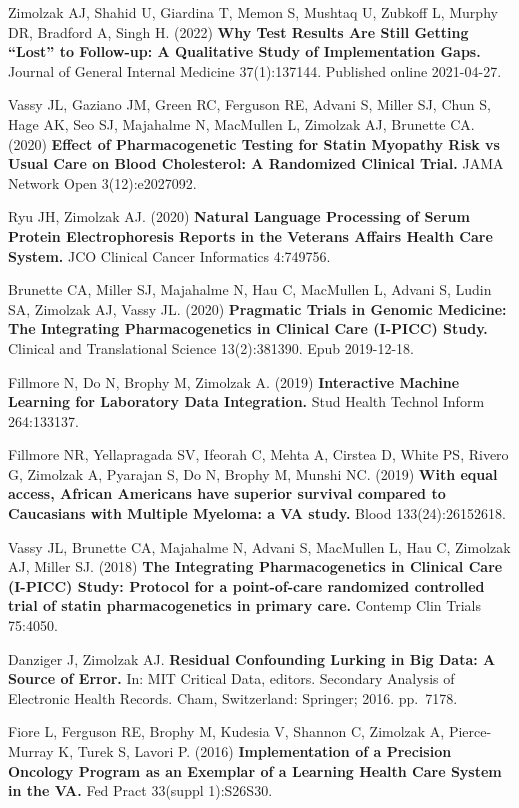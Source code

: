 \documentclass[10pt]{article}
\begin{document}
Zimolzak AJ, Shahid U, Giardina T, Memon S, Mushtaq U, Zubkoff L,
Murphy DR, Bradford A, Singh H. (2022) \textbf{Why Test Results Are
  Still Getting ``Lost'' to Follow-up: A Qualitative Study of
  Implementation Gaps.} Journal of General Internal Medicine
37(1):137\ndash{}144. Published online 2021-04-27.

Vassy JL, Gaziano JM, Green RC, Ferguson RE, Advani S, Miller SJ, Chun
S, Hage AK, Seo SJ, Majahalme N, MacMullen L, Zimolzak AJ, Brunette
CA. (2020) \textbf{Effect of Pharmacogenetic Testing for Statin
  Myopathy Risk vs Usual Care on Blood Cholesterol: A Randomized
  Clinical Trial.} JAMA Network Open 3(12):e2027092.

Ryu JH, Zimolzak AJ. (2020) \textbf{Natural Language Processing of
  Serum Protein Electrophoresis Reports in the Veterans Affairs Health
  Care System.} JCO Clinical Cancer Informatics 4:749\ndash{}756.

Brunette CA, Miller SJ, Majahalme N, Hau C, MacMullen L, Advani S,
Ludin SA, Zimolzak AJ, Vassy JL. (2020) \textbf{Pragmatic Trials in
  Genomic Medicine: The Integrating Pharmacogenetics in Clinical Care
  (I-PICC) Study.} Clinical and Translational Science
13(2):381\ndash{}390. Epub 2019-12-18.

Fillmore N, Do N, Brophy M, Zimolzak A. (2019) \textbf{Interactive
  Machine Learning for Laboratory Data Integration.} Stud Health
Technol Inform 264:133\ndash{}137.

Fillmore NR, Yellapragada SV, Ifeorah C, Mehta A, Cirstea D, White PS,
Rivero G, Zimolzak A, Pyarajan S, Do N, Brophy M, Munshi NC. (2019)
\textbf{With equal access, African Americans have superior survival
  compared to Caucasians with Multiple Myeloma: a VA study.} Blood
133(24):2615\ndash{}2618.

Vassy JL, Brunette CA, Majahalme N, Advani S, MacMullen L, Hau C,
Zimolzak AJ, Miller SJ. (2018) \textbf{The Integrating
  Pharmacogenetics in Clinical Care (I-PICC) Study: Protocol for a
  point-of-care randomized controlled trial of statin pharmacogenetics
  in primary care.} Contemp Clin Trials 75:40\ndash{}50.

Danziger J, Zimolzak AJ. \textbf{Residual Confounding Lurking in Big
  Data: A Source of Error.} In: MIT Critical Data, editors. Secondary
Analysis of Electronic Health Records. Cham, Switzerland: Springer;
2016. pp.\ 71\ndash{}78.

Fiore L, Ferguson RE, Brophy M, Kudesia V, Shannon C, Zimolzak A,
Pierce-Murray K, Turek S, Lavori P. (2016) \textbf{Implementation of a
  Precision Oncology Program as an Exemplar of a Learning Health Care
  System in the VA.} Fed Pract 33(suppl 1):S26\ndash{}S30.
\end{document}
